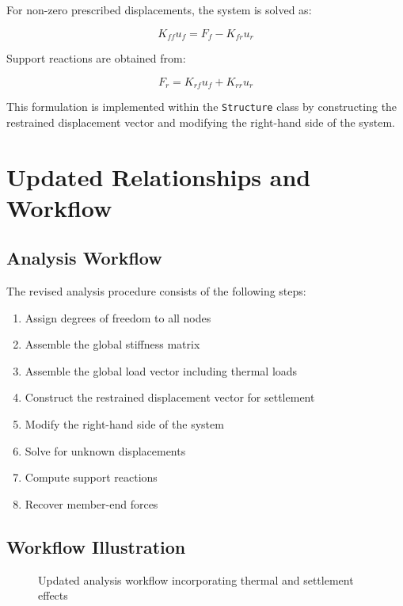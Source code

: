 For non-zero prescribed displacements, the system is solved as:

\begin{equation}
K_{ff} u_f = F_f - K_{fr} u_r
\end{equation}

Support reactions are obtained from:

\begin{equation}
F_r = K_{rf} u_f + K_{rr} u_r
\end{equation}

This formulation is implemented within the \texttt{Structure} class by constructing the restrained displacement vector and modifying the right-hand side of the system.
\pagebreak
\section{Updated Relationships and Workflow}

\subsection{Analysis Workflow}

The revised analysis procedure consists of the following steps:

\begin{enumerate}
    \item Assign degrees of freedom to all nodes
    \item Assemble the global stiffness matrix
    \item Assemble the global load vector including thermal loads
    \item Construct the restrained displacement vector for settlement
    \item Modify the right-hand side of the system
    \item Solve for unknown displacements
    \item Compute support reactions
    \item Recover member-end forces
\end{enumerate}

\subsection{Workflow Illustration}

\begin{figure}[H]
    \centering
    \caption{Updated analysis workflow incorporating thermal and settlement effects}
    \label{fig:workflow_assignment4}
\end{figure}
\pagebreak
